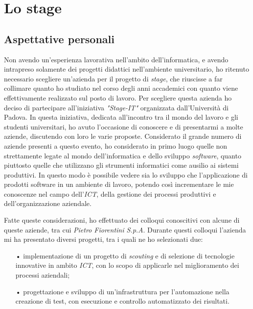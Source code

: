 \chapter{Lo stage}

\section{Aspettative personali}

Non avendo un'esperienza lavorativa nell'ambito dell'informatica, e avendo intrapreso solamente dei progetti didattici nell'ambiente universitario, ho ritenuto necessario scegliere un'azienda per il progetto di \textit{stage}, che riuscisse a far collimare quanto ho studiato nel corso degli anni accademici con quanto viene effettivamente realizzato sul posto di lavoro.
Per scegliere questa azienda ho deciso di partecipare all'iniziativa \textit{"Stage-IT"} organizzata dall'Università di Padova. In questa iniziativa, dedicata all'incontro tra il mondo del lavoro e gli studenti universitari, ho avuto l'occasione di conoscere e di presentarmi a molte aziende, discutendo con loro le varie proposte.
Considerato il grande numero di aziende presenti a questo evento, ho considerato in primo luogo quelle non strettamente legate al mondo dell'informatica e dello sviluppo \textit{software}, quanto piuttosto quelle che utilizzano gli strumenti informatici come ausilio ai sistemi produttivi. In questo modo è possibile vedere sia lo sviluppo che l'applicazione di prodotti software in un ambiente di lavoro, potendo così incrementare le mie conoscenze nel campo dell'\textit{ICT}, della gestione dei processi produttivi e dell'organizzazione aziendale.

Fatte queste considerazioni, ho effettuato dei colloqui conoscitivi con alcune di queste aziende, tra cui \textit{Pietro Fiorentini S.p.A}. Durante questi colloqui l'azienda mi ha presentato diversi progetti, tra i quali ne ho selezionati due:
\begin{itemize}
	\item[•] implementazione di un progetto di \textit{scouting} e di selezione di tecnologie innovative in ambito \textit{ICT}, con lo scopo di applicarle nel miglioramento dei processi aziendali;
	\item[•] progettazione e sviluppo di un'infrastruttura per l'automazione nella creazione di test, con esecuzione e controllo automatizzato dei risultati.
\end{itemize}

